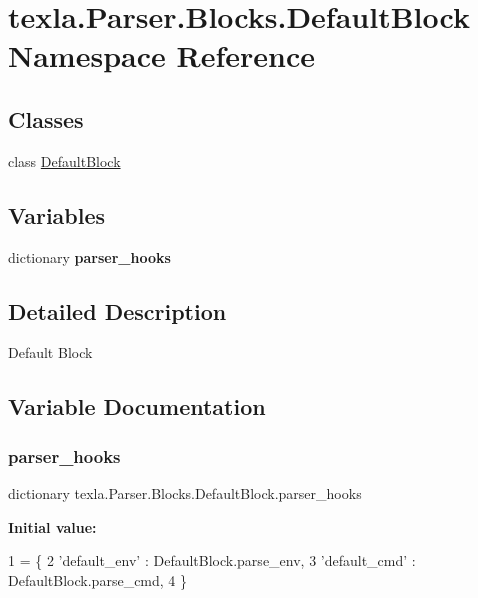 \hypertarget{namespacetexla_1_1Parser_1_1Blocks_1_1DefaultBlock}{}\section{texla.\+Parser.\+Blocks.\+Default\+Block Namespace Reference}
\label{namespacetexla_1_1Parser_1_1Blocks_1_1DefaultBlock}
\subsection*{Classes}
\begin{DoxyCompactItemize}
\item 
class \hyperlink{classtexla_1_1Parser_1_1Blocks_1_1DefaultBlock_1_1DefaultBlock}{Default\+Block}
\end{DoxyCompactItemize}
\subsection*{Variables}
\begin{DoxyCompactItemize}
\item 
dictionary {\bfseries parser\+\_\+hooks}
\end{DoxyCompactItemize}


\subsection{Detailed Description}
\begin{DoxyVerb}Default Block\end{DoxyVerb}
 

\subsection{Variable Documentation}
\hypertarget{namespacetexla_1_1Parser_1_1Blocks_1_1DefaultBlock_a21955e26d69862ea2157b3ca48b5f7c4}{}\label{namespacetexla_1_1Parser_1_1Blocks_1_1DefaultBlock_a21955e26d69862ea2157b3ca48b5f7c4} 
\subsubsection{\texorpdfstring{parser\+\_\+hooks}{parser\_hooks}}
{\footnotesize\ttfamily dictionary texla.\+Parser.\+Blocks.\+Default\+Block.\+parser\+\_\+hooks}

{\bfseries Initial value\+:}
\begin{DoxyCode}
1 =  \{
2     \textcolor{stringliteral}{'default\_env'} : DefaultBlock.parse\_env,
3     \textcolor{stringliteral}{'default\_cmd'} : DefaultBlock.parse\_cmd,
4     \}
\end{DoxyCode}
